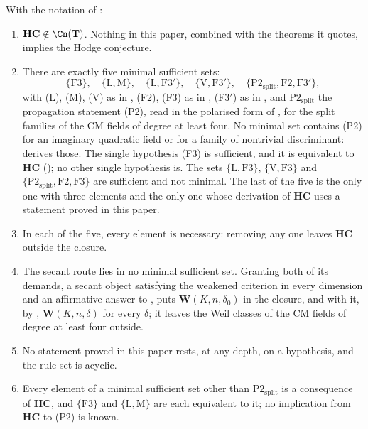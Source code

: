 \begin{theorem}\label{thm:closure}
With the notation of :
\begin{enumerate}[label=\textup{(\roman*)},leftmargin=2.6em]
\item $\mathbf{HC}\notin\Cn(\mathbf{T})$. Nothing in this paper, combined with the
  theorems it quotes, implies the Hodge conjecture.
\item There are exactly five minimal sufficient sets:
  \[
    \{\mathrm{F3}\},\quad\{\mathrm{L},\mathrm{M}\},\quad
    \{\mathrm{L},\mathrm{F3}'\},\quad\{\mathrm{V},\mathrm{F3}'\},\quad
    \{\mathrm{P2}_{\mathrm{split}},\mathrm{F2},\mathrm{F3}'\},
  \]
  with \textup{(L)}, \textup{(M)}, \textup{(V)} as in ,
  \textup{(F2)}, \textup{(F3)} as in , (F3$'$) as in
  , and $\mathrm{P2}_{\mathrm{split}}$ the propagation
  statement \textup{(P2)}, read in the polarised form of ,
  for the split families of the CM fields of degree at least four. No
  minimal set contains \textup{(P2)} for an imaginary quadratic field or for
  a family of nontrivial discriminant:  derives those.
  The single hypothesis (F3) is sufficient, and it is equivalent to
  $\mathbf{HC}$ (); no other single hypothesis is.
  The sets $\{\mathrm{L},\mathrm{F3}\}$, $\{\mathrm{V},\mathrm{F3}\}$ and
  $\{\mathrm{P2}_{\mathrm{split}},\mathrm{F2},\mathrm{F3}\}$ are sufficient and
  not minimal. The last of the five is the only one with three elements and the
  only one whose derivation of $\mathbf{HC}$ uses a statement proved in this
  paper.
\item In each of the five, every element is necessary: removing any one
  leaves $\mathbf{HC}$ outside the closure.
\item The secant route lies in no minimal sufficient set. Granting both of its
  demands, a secant object satisfying the weakened criterion in every
  dimension and an affirmative answer to \cite[Question 11.4]{Mar25b}, puts
  $\mathbf{W}(K,n,\delta_{0})$ in the closure, and with it, by
  , $\mathbf{W}(K,n,\delta)$ for every $\delta$; it leaves
  the Weil classes of the CM fields of degree at least four outside.
\item No statement proved in this paper rests, at any depth, on a
  hypothesis, and the rule set is acyclic.
\item Every element of a minimal sufficient set other than
  $\mathrm{P2}_{\mathrm{split}}$ is a consequence of $\mathbf{HC}$, and $\{\mathrm{F3}\}$ and
  $\{\mathrm{L},\mathrm{M}\}$ are each equivalent to it; no implication from
  $\mathbf{HC}$ to \textup{(P2)} is known.
\end{enumerate}
\end{theorem}

